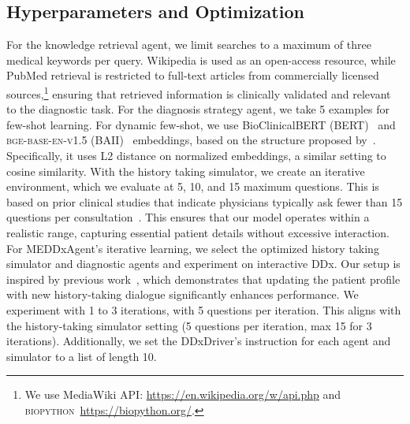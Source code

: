 \subsection{Hyperparameters and Optimization}
\label{subsec:hyperaparemeters_optimization}


For the knowledge retrieval agent, we limit searches to a maximum of three medical keywords per query. Wikipedia is used as an open-access resource, while PubMed retrieval is restricted to full-text articles from commercially licensed sources,\footnote{We use MediaWiki API: \url{https://en.wikipedia.org/w/api.php} and \textsc{biopython}~\url{https://biopython.org/}.} ensuring that retrieved information is clinically validated and relevant to the diagnostic task. For the diagnosis strategy agent, we take 5 examples for few-shot learning. For dynamic few-shot, we use BioClinicalBERT (BERT)~\citep{alsentzer-etal-2019-publicly} and \textsc{bge-base-en-v1.5} (BAII)~\citep{xiao-etal-2024-bge} embeddings, based on the structure proposed by~\citet{wu2024streambench}. Specifically, it uses L2 distance on normalized embeddings, a similar setting to cosine similarity. With the history taking simulator, we create an iterative environment, which we evaluate at 5, 10, and 15 maximum questions. This is based on prior clinical studies that indicate physicians typically ask fewer than 15 questions per consultation~\citep{ely1999analysis}. This ensures that our model operates within a realistic range, capturing essential patient details without excessive interaction. 
For MEDDxAgent's iterative learning, we select the optimized history taking simulator and diagnostic agents and experiment on interactive DDx. Our setup is inspired by previous work~\citep{johri2025craftmd}, which demonstrates that updating the patient profile with new history-taking dialogue significantly enhances performance. We experiment with 1 to 3 iterations, with 5 questions per iteration. This aligns with the history-taking simulator setting (5 questions per iteration, max 15 for 3 iterations). Additionally, we set the DDxDriver's instruction for each agent and simulator to a list of length 10.
\vspace{-0.5em}

